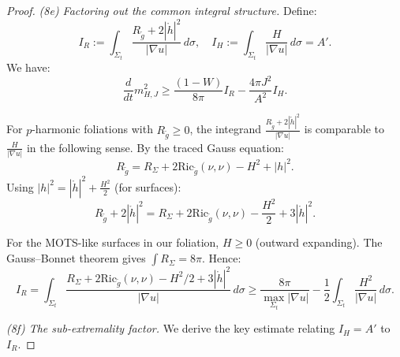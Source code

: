 \documentclass[12pt]{article}
\theoremstyle{plain}
\theoremstyle{definition}
\theoremstyle{remark}
\newcommand{\Ric}{\mathrm{Ric}}
\newcommand{\tg}{\tilde{g}}
\begin{document}
\begin{proof}
\textit{(8e) Factoring out the common integral structure.} Define:
\[
I_R := \int_{\Sigma_t}\frac{R_{\tg} + 2|\mathring{h}|^2}{|\nabla u|}\,d\sigma, \quad I_H := \int_{\Sigma_t}\frac{H}{|\nabla u|}\,d\sigma = A'.
\]
We have:
\[
\frac{d}{dt}m_{H,J}^2 \geq \frac{(1-W)}{8\pi}I_R - \frac{4\pi J^2}{A^2}I_H.
\]

For $p$-harmonic foliations with $R_{\tg} \geq 0$, the integrand $\frac{R_{\tg}+2|\mathring{h}|^2}{|\nabla u|}$ is comparable to $\frac{H}{|\nabla u|}$ in the following sense. By the traced Gauss equation:
\[
R_{\tg} = R_\Sigma + 2\Ric_{\tg}(\nu,\nu) - H^2 + |h|^2.
\]
Using $|h|^2 = |\mathring{h}|^2 + \frac{H^2}{2}$ (for surfaces):
\[
R_{\tg} + 2|\mathring{h}|^2 = R_\Sigma + 2\Ric_{\tg}(\nu,\nu) - \frac{H^2}{2} + 3|\mathring{h}|^2.
\]

For the MOTS-like surfaces in our foliation, $H \geq 0$ (outward expanding). The Gauss--Bonnet theorem gives $\int R_\Sigma = 8\pi$. Hence:
\[
I_R = \int_{\Sigma_t}\frac{R_\Sigma + 2\Ric_{\tg}(\nu,\nu) - H^2/2 + 3|\mathring{h}|^2}{|\nabla u|}\,d\sigma \geq \frac{8\pi}{\max_{\Sigma_t}|\nabla u|} - \frac{1}{2}\int_{\Sigma_t}\frac{H^2}{|\nabla u|}\,d\sigma.
\]

\textit{(8f) The sub-extremality factor.} We derive the key estimate relating $I_H = A'$ to $I_R$.


\end{proof}
\end{document}
